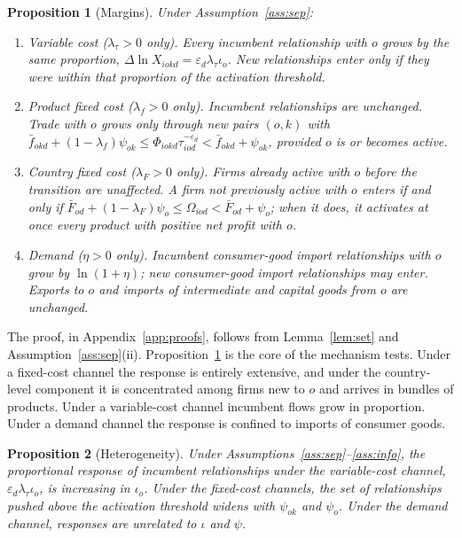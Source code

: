 \documentclass[12pt]{article}
\newtheorem{proposition}{Proposition}
\theoremstyle{remark}
\begin{document}
\begin{proposition}[Margins]\label{prop:margins}
Under Assumption~\ref{ass:sep}:
\begin{enumerate}[label=(\alph*),itemsep=0.1em]
\item \emph{Variable cost} ($\lambda_\tau>0$ only). Every incumbent relationship
with $o$ grows by the same proportion,
$\Delta\ln X_{iokd}=\varepsilon_d\lambda_\tau\iota_o$. New relationships enter
only if they were within that proportion of the activation threshold.
\item \emph{Product fixed cost} ($\lambda_f>0$ only). Incumbent relationships are
unchanged. Trade with $o$ grows only through new pairs $(o,k)$ with
$\bar f_{okd}+(1-\lambda_f)\psi_{ok}\leq\Phi_{iokd}\tau_{iod}^{-\varepsilon_d}
<\bar f_{okd}+\psi_{ok}$, provided $o$ is or becomes active.
\item \emph{Country fixed cost} ($\lambda_F>0$ only). Firms already active with
$o$ before the transition are unaffected. A firm not previously active with $o$
enters if and only if $\bar F_{od}+(1-\lambda_F)\psi_o\leq\Omega_{iod}<
\bar F_{od}+\psi_o$; when it does, it activates at once every product with
positive net profit with $o$.
\item \emph{Demand} ($\eta>0$ only). Incumbent consumer-good import
relationships with $o$ grow by $\ln(1+\eta)$; new consumer-good import
relationships may enter. Exports to $o$ and imports of intermediate and
capital goods from $o$ are unchanged.
\end{enumerate}
\end{proposition}

\noindent The proof, in Appendix~\ref{app:proofs}, follows from
Lemma~\ref{lem:set} and Assumption~\ref{ass:sep}(ii). Proposition~\ref{prop:margins}
is the core of the mechanism tests. Under a fixed-cost channel the response is
entirely extensive, and under the country-level component it is concentrated
among firms new to $o$ and arrives in bundles of products. Under a
variable-cost channel incumbent flows grow in proportion. Under a demand
channel the response is confined to imports of consumer goods.

\begin{proposition}[Heterogeneity]\label{prop:hetero}
Under Assumptions~\ref{ass:sep}--\ref{ass:info}, the proportional response of
incumbent relationships under the variable-cost channel,
$\varepsilon_d\lambda_\tau\iota_o$, is increasing in $\iota_o$. Under the
fixed-cost channels, the set of relationships pushed above the activation
threshold widens with $\psi_{ok}$ and $\psi_o$. Under the demand channel,
responses are unrelated to $\iota$ and $\psi$.
\end{proposition}
\end{document}
